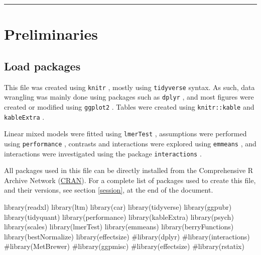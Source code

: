 \documentclass[
  bookmarksnumbered]{article}
\newenvironment{Shaded}{\begin{snugshade}}{\end{snugshade}}
\newcommand{\CommentTok}[1]{\textcolor[rgb]{0.50,0.62,0.50}{#1}}
\newcommand{\FunctionTok}[1]{\textcolor[rgb]{0.94,0.94,0.56}{#1}}
\newcommand{\NormalTok}[1]{\textcolor[rgb]{0.80,0.80,0.80}{#1}}
\begin{document}
\par
\endgroup

{\hypersetup{hidelinks}
\setcounter{tocdepth}{6}
\tableofcontents
}
\opensupplement

\begin{center}\rule{0.5\linewidth}{0.5pt}\end{center}

\section{Preliminaries}\label{preliminaries}

\subsection{Load packages}\label{load-packages}

This file was created using \texttt{knitr} \autocite{knitrcit}, mostly using \texttt{tidyverse} \autocite{tidyversecit} syntax. As such, data wrangling was mainly done using packages such as \texttt{dplyr} \autocite{dplyrcit}, and most figures were created or modified using \texttt{ggplot2} \autocite{ggplotcit}. Tables were created using \texttt{knitr::kable} and \texttt{kableExtra} \autocite{kableExtracit}.

Linear mixed models were fitted using \texttt{lmerTest} \autocite{lmertestcit}, assumptions were performed using \texttt{performance} \autocite{ludecke2021}, contrasts and interactions were explored using \texttt{emmeans} \autocite{emmeanscit}, and interactions were investigated using the package \texttt{interactions} \autocite{interactionscit}.

All packages used in this file can be directly installed from the Comprehensive R Archive Network (\href{https://cran.r-project.org/}{CRAN}). For a complete list of packages used to create this file, and their versions, see section \ref{session}, at the end of the document.

\begin{Shaded}
\begin{Highlighting}[]
\FunctionTok{library}\NormalTok{(readxl)}
\FunctionTok{library}\NormalTok{(ltm)}
\FunctionTok{library}\NormalTok{(car)}
\FunctionTok{library}\NormalTok{(tidyverse)}
\FunctionTok{library}\NormalTok{(ggpubr)}
\FunctionTok{library}\NormalTok{(tidyquant)}
\FunctionTok{library}\NormalTok{(performance)}
\FunctionTok{library}\NormalTok{(kableExtra)}
\FunctionTok{library}\NormalTok{(psych)}
\FunctionTok{library}\NormalTok{(scales)}
\FunctionTok{library}\NormalTok{(lmerTest)}
\FunctionTok{library}\NormalTok{(emmeans)}
\FunctionTok{library}\NormalTok{(berryFunctions)}
\FunctionTok{library}\NormalTok{(bestNormalize)}
\FunctionTok{library}\NormalTok{(effectsize)}
\CommentTok{\#library(dplyr)}
\CommentTok{\#library(interactions)}
\CommentTok{\#library(MetBrewer)}
\CommentTok{\#library(ggpmisc)}
\CommentTok{\#library(effectsize)}
\CommentTok{\#library(rstatix)}
\end{Highlighting}
\end{Shaded}
\end{document}
